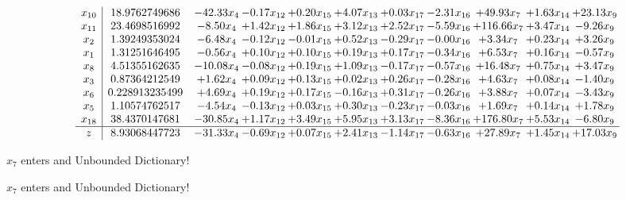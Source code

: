\documentclass[9pt]{article}
\begin{document}
 \[\begin{array}{c| c c@{\hskip 2pt} c@{\hskip 2pt} c@{\hskip 2pt} c@{\hskip 2pt} c@{\hskip 2pt} c@{\hskip 2pt} c@{\hskip 2pt} c@{\hskip 2pt} c@{\hskip 2pt} }
 x_{10}   &  18.9762749686 & -42.33 x_{4} & -0.17 x_{12} & +  0.20 x_{15} & +  4.07 x_{13} & +  0.03 x_{17} & -2.31 x_{16} & + 49.93 x_{7} & +  1.63 x_{14} & + 23.13 x_{9}\\
 x_{11}   &  23.4698516992 & -8.50 x_{4} & +  1.42 x_{12} & +  1.86 x_{15} & +  3.12 x_{13} & +  2.52 x_{17} & -5.59 x_{16} & + 116.66 x_{7} & +  3.47 x_{14} & -9.26 x_{9}\\
 x_{2}   &  1.39249353024 & -6.48 x_{4} & -0.12 x_{12} & -0.01 x_{15} & +  0.52 x_{13} & -0.29 x_{17} & -0.00 x_{16} & +  3.34 x_{7} & +  0.23 x_{14} & +  3.26 x_{9}\\
 x_{1}   &  1.31251646495 & -0.56 x_{4} & +  0.10 x_{12} & +  0.10 x_{15} & +  0.19 x_{13} & +  0.17 x_{17} & -0.34 x_{16} & +  6.53 x_{7} & +  0.16 x_{14} & -0.57 x_{9}\\
 x_{8}   &  4.51355162635 & -10.08 x_{4} & -0.08 x_{12} & +  0.19 x_{15} & +  1.09 x_{13} & -0.17 x_{17} & -0.57 x_{16} & + 16.48 x_{7} & +  0.75 x_{14} & +  3.47 x_{9}\\
 x_{3}   &  0.87364212549 & +  1.62 x_{4} & +  0.09 x_{12} & +  0.13 x_{15} & +  0.02 x_{13} & +  0.26 x_{17} & -0.28 x_{16} & +  4.63 x_{7} & +  0.08 x_{14} & -1.40 x_{9}\\
 x_{6}   &  0.228913235499 & +  4.69 x_{4} & +  0.19 x_{12} & +  0.17 x_{15} & -0.16 x_{13} & +  0.31 x_{17} & -0.26 x_{16} & +  3.88 x_{7} & +  0.07 x_{14} & -3.43 x_{9}\\
 x_{5}   &  1.10574762517 & -4.54 x_{4} & -0.13 x_{12} & +  0.03 x_{15} & +  0.30 x_{13} & -0.23 x_{17} & -0.03 x_{16} & +  1.69 x_{7} & +  0.14 x_{14} & +  1.78 x_{9}\\
 x_{18}   &  38.4370147681 & -30.85 x_{4} & +  1.17 x_{12} & +  3.49 x_{15} & +  5.95 x_{13} & +  3.13 x_{17} & -8.36 x_{16} & + 176.80 x_{7} & +  5.53 x_{14} & -6.80 x_{9}\\
\hline
z    &  8.93068447723 & -31.33 x_{4} & -0.69 x_{12} & +  0.07 x_{15} & +  2.41 x_{13} & -1.14 x_{17} & -0.63 x_{16} & + 27.89 x_{7} & +  1.45 x_{14} & + 17.03 x_{9}\\
\end{array}\]


 $ x_{7} $ enters and Unbounded Dictionary!


 $ x_{7} $ enters and Unbounded Dictionary!
\end{document}
